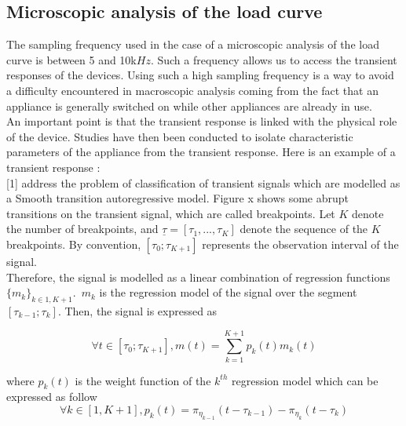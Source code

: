 
\subsection{Microscopic analysis of the load curve}
The sampling frequency used in the case of a microscopic analysis of the load curve is between 5 and 10k$Hz$. Such a frequency allows us to access the transient responses of the devices. Using such a high sampling frequency is a way to avoid a difficulty encountered in macroscopic analysis coming from the fact that an appliance is generally switched on while other appliances are already in use. 
\\

An important point is that the transient response is linked with the physical role of the device. Studies have then been conducted to isolate characteristic parameters of the appliance from the transient response. Here is an example of a transient response :
\\





[1] address the problem of classification of transient signals which are modelled as a Smooth transition autoregressive model. Figure x shows some abrupt transitions on the transient signal, which are called breakpoints. Let $K$ denote the number of breakpoints, and $\underline{\tau} = [\tau_1,...,\tau_K]$ denote the sequence of the $K$ breakpoints. By convention, $[\tau_0;\tau_{K+1}]$ represents the observation interval of the signal. 
\\

 Therefore, the signal is modelled as a linear combination of regression functions $\{m_k\}_{k\in{1,K+1}}$.~$m_k$ is the regression model of the signal over the segment $[\tau_{k-1};\tau_{k}]$. Then, the signal is expressed as

\begin{equation}
\forall t\in [\tau_0;\tau_{K+1}],m(t)= \sum_{k=1}^{K+1}p_k(t)m_k(t)
\end{equation}

where $p_k(t)$ is the weight function of the $k^{th}$ regression model which can be expressed as follow
\begin{equation}
\forall k\in [1,K+1], p_k(t)= \pi_{\eta_{k-1}}(t-\tau_{k-1})-\pi_{\eta_{k}}(t-\tau_{k})
\end{equation}

